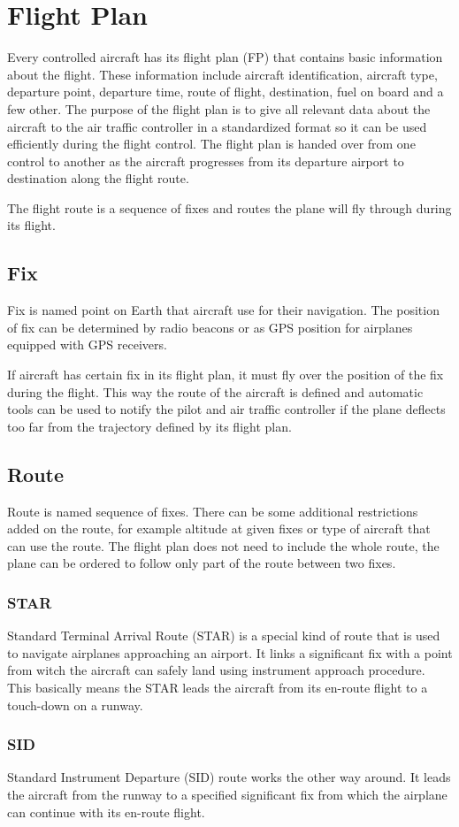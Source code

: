 
\section{Flight Plan}

Every controlled aircraft has its flight plan (FP) that contains basic information about the flight. These information include aircraft identification, aircraft type, departure point, departure time, route of flight, destination, fuel on board and a few other. \cite[Chapter 5]{aim} The purpose of the flight plan is to give all relevant data about the aircraft to the air traffic controller in a standardized format so it can be used efficiently during the flight control. The flight plan is handed over from one control to another as the aircraft progresses from its departure airport to destination along the flight route.

The flight route is a sequence of fixes and routes the plane will fly through during its flight.

\subsection{Fix}
Fix is named point on Earth that aircraft use for their navigation. The position of fix can be determined by radio beacons or as GPS position for airplanes equipped with GPS receivers.

If aircraft has certain fix in its flight plan, it must fly over the position of the fix during the flight. This way the route of the aircraft is defined and automatic tools can be used to notify the pilot and air traffic controller if the plane deflects too far from the trajectory defined by its flight plan.

\subsection{Route}
Route is named sequence of fixes. There can be some additional restrictions added on the route, for example altitude at given fixes or type of aircraft that can use the route. The flight plan does not need to include the whole route, the plane can be ordered to follow only part of the route between two fixes.

\subsubsection{STAR}
Standard Terminal Arrival Route (STAR) is a special kind of route that is used to navigate airplanes approaching an airport. It links a significant fix with a point from witch the aircraft can safely land using instrument approach procedure. \cite{doc4444} This basically means the STAR leads the aircraft from its en-route flight to a touch-down on a runway.

\subsubsection{SID}
Standard Instrument Departure (SID) route works the other way around. It leads the aircraft from the runway to a specified significant fix from which the airplane can continue with its en-route flight.
